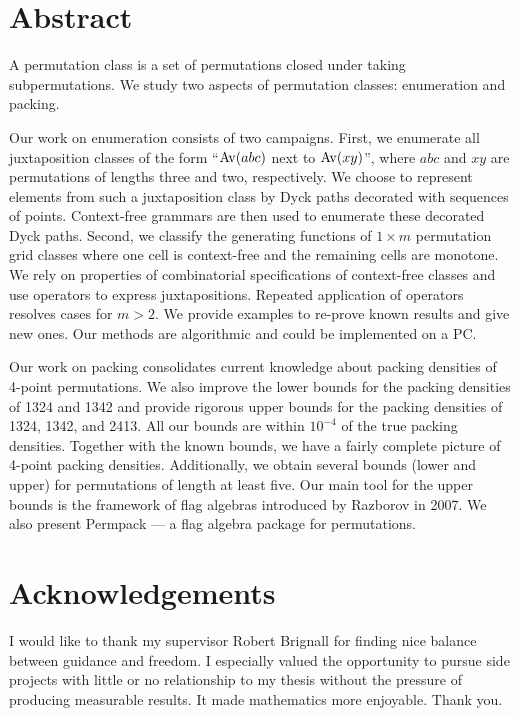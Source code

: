 \documentclass[12pt, a4paper, twoside]{report}
\begin{document}




\setcounter{secnumdepth}{-3}%
\chapter{Abstract}
A permutation class is a set of permutations closed under taking subpermutations. We study two aspects of permutation classes: enumeration and packing.

Our work on enumeration consists of two campaigns. First, we enumerate all juxtaposition classes of the form ``$\mathrm{Av}(abc)$ next to $\mathrm{Av}(xy)$'', where $abc$ and $xy$ are permutations of lengths three and two, respectively. We choose to represent elements from such a juxtaposition class by Dyck paths decorated with sequences of points. Context-free grammars are then used to enumerate these decorated Dyck paths. Second, we classify the generating functions of $1\times m$ permutation grid classes where one cell is context-free and the remaining cells are monotone. We rely on properties of combinatorial specifications of context-free classes and use operators to express juxtapositions. Repeated application of operators resolves cases for $m>2$. We provide examples to re-prove known results and give new ones. Our methods are algorithmic and could be implemented on a PC.

Our work on packing consolidates current knowledge about packing densities of 4-point permutations. We also improve the lower bounds for the packing densities of 1324 and 1342 and provide rigorous upper bounds for the packing densities of 1324, 1342, and 2413. All our bounds are within $10^{-4}$ of the true packing densities. Together with the known bounds, we have a fairly complete picture of 4-point packing densities. Additionally, we obtain several bounds (lower and upper) for permutations of length at least five. Our main tool for the upper bounds is the framework of flag algebras introduced by Razborov in 2007. We also present Permpack --- a flag algebra package for permutations. 
\afterpage{\null\newpage}

\chapter{Acknowledgements}
I would like to thank my supervisor Robert Brignall for finding nice balance between guidance and freedom. I especially valued the opportunity to pursue side projects with little or no relationship to my thesis without the pressure of producing measurable results. It made mathematics more enjoyable. Thank you.
\end{document}

